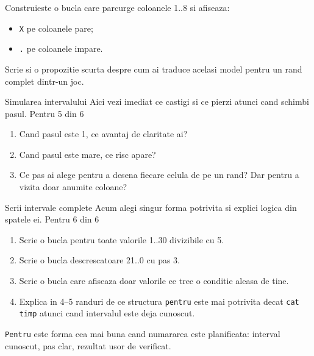 \begin{guidebox}
Construieste o bucla care parcurge coloanele 1..8 si afiseaza:
\begin{itemize}
\item \texttt{X} pe coloanele pare;
\item \texttt{.} pe coloanele impare.
\end{itemize}

Scrie si o propozitie scurta despre cum ai traduce acelasi model pentru un rand complet dintr-un joc.
\end{guidebox}

\clearpage

\PageHeader
  {Simularea intervalului}
  {Aici vezi imediat ce castigi si ce pierzi atunci cand schimbi pasul.}
  {Pentru 5 din 6}


\begin{semibox}
\begin{enumerate}
\item Cand pasul este 1, ce avantaj de claritate ai?
\item Cand pasul este mare, ce risc apare?
\item Ce pas ai alege pentru a desena fiecare celula de pe un rand? Dar pentru a vizita doar anumite coloane?
\end{enumerate}
\end{semibox}

\clearpage

\PageHeader
  {Scrii intervale complete}
  {Acum alegi singur forma potrivita si explici logica din spatele ei.}
  {Pentru 6 din 6}


\begin{solobox}
\begin{enumerate}
\item Scrie o bucla pentru toate valorile 1..30 divizibile cu 5.
\item Scrie o bucla descrescatoare 21..0 cu pas 3.
\item Scrie o bucla care afiseaza doar valorile ce trec o conditie aleasa de tine.
\item Explica in 4--5 randuri de ce structura \texttt{pentru} este mai potrivita decat \texttt{cat timp} atunci cand intervalul este deja cunoscut.
\end{enumerate}
\end{solobox}

\begin{checkpointbox}
\texttt{Pentru} este forma cea mai buna cand numararea este planificata: interval cunoscut, pas clar, rezultat usor de verificat.
\end{checkpointbox}

\clearpage
